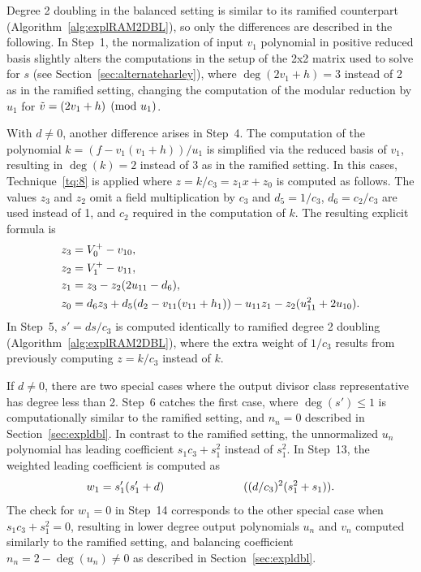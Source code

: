 Degree 2 doubling in the balanced setting is similar to its ramified counterpart
(Algorithm~\ref{alg:explRAM2DBL}), so only the differences are described in the
following. In Step~1, the normalization of input $v_1$ polynomial in positive
reduced basis slightly alters the computations in the setup of the 2x2 matrix
used to solve for $s$ (see Section~\ref{sec:alternateharley}), where $\deg(2v_1
+ h) = 3$ instead of 2 as in the ramified setting, changing the computation of
the modular reduction by $u_1$ for $\tilde{v} = (2v_1 + h) \pmod{u_1}$. 

With $d \neq 0$, another difference arises in Step~4. The computation of the
polynomial $k = (f - v_1(v_1 + h))/u_1$ is simplified via the reduced basis of
$v_1$, resulting in $\deg(k) =2$ instead of $3$ as in the ramified setting.
In this cases, Technique~\ref{tq:8} is applied where $z = k/c_3 = z_1x + z_0$ is computed
as follows. The values $z_3$ and $z_2$ omit a field multiplication by $c_3$ and
$d_5 = 1/c_3$, $d_6 = c_2/c_3$ are used instead of 1, and $c_2$  required in the
computation of $k$. The resulting explicit formula is
\begin{align*}
    z_3  &= V^{+}_0 - v_{10},\\
    z_2  &= V^{+}_1 - v_{11},\\
    z_1  &= z_3 - z_2(2u_{11} - d_6),\\
    z_0  &= d_6z_3 + d_5(d_2 - v_{11}(v_{11} + h_1)) - u_{11}z_1 - z_2(u_{11}^2 + 2u_{10}).
\end{align*} 
In Step~5, $s' = ds/c_3$ is computed identically to ramified degree 2 doubling
(Algorithm~\ref{alg:explRAM2DBL}), where the extra weight of $1/c_3$ results from
previously computing $z = k/c_3$ instead of $k$.

If $d \neq 0$, there are two special cases where the output divisor class
representative has degree less than 2. Step~6 catches the first case, where
$\deg(s') \leq 1$ is computationally similar to the ramified setting, and $n_n =
0$ described in Section~\ref{sec:expldbl}. In contrast to the ramified setting,
the unnormalized $u_n$ polynomial has leading coefficient $s_1c_3 + s_1^2$
instead of $s_1^2$. In Step~13, the weighted leading coefficient is computed as
$$ w_1 = s_1'(s_1' + d) \quad\quad\quad\quad\quad\quad\quad ((d/c_3)^2(s_1^2 + s_1)). $$ The check
for $w_1 = 0$ in Step~14 corresponds to the other special case when $s_1c_3 +
s_1^2 = 0$, resulting in lower degree output polynomials $u_n$ and $v_n$
computed similarly to the ramified setting, and balancing coefficient $n_n = 2 -
\deg(u_n) \neq 0$ as described in Section~\ref{sec:expldbl}.

